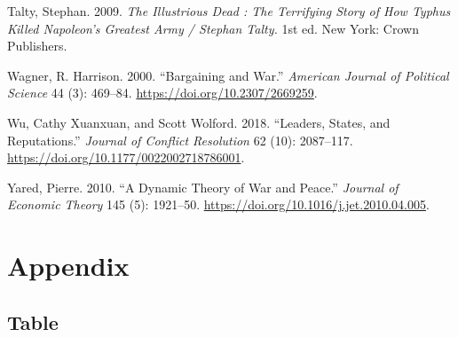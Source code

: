 \documentclass[
  12pt,
]{article}
\newlength{\cslhangindent}
\newenvironment{CSLReferences}[2] %
 {\begin{list}{}{%
  \setlength{\itemindent}{0pt}
  \setlength{\leftmargin}{0pt}
  \setlength{\parsep}{0pt}
  \ifodd #1
   \setlength{\leftmargin}{\cslhangindent}
   \setlength{\itemindent}{-1\cslhangindent}
  \fi
  \setlength{\itemsep}{#2\baselineskip}}}
 {\end{list}}
\theoremstyle{plain}
\theoremstyle{plain}
\theoremstyle{remark}
\begin{document}
\begin{CSLReferences}{1}{0}
Talty, Stephan. 2009. \emph{The Illustrious Dead : The Terrifying Story
of How Typhus Killed {Napoleon}'s Greatest Army / {Stephan Talty}.} 1st
ed. New York: Crown Publishers.

Wagner, R. Harrison. 2000. {``Bargaining and {War}.''} \emph{American
Journal of Political Science} 44 (3): 469--84.
\url{https://doi.org/10.2307/2669259}.

Wu, Cathy Xuanxuan, and Scott Wolford. 2018. {``Leaders, {States}, and
{Reputations}.''} \emph{Journal of Conflict Resolution} 62 (10):
2087--117. \url{https://doi.org/10.1177/0022002718786001}.

Yared, Pierre. 2010. {``A Dynamic Theory of War and Peace.''}
\emph{Journal of Economic Theory} 145 (5): 1921--50.
\url{https://doi.org/10.1016/j.jet.2010.04.005}.

\end{CSLReferences}

\newpage

\section{Appendix}\label{sec-appendix}

\startcontents[appendix]


\subsection{Table}\label{table}
\end{document}

